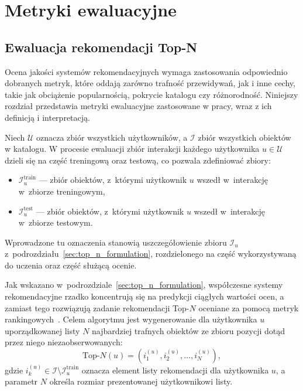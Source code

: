 \chapter{Metryki ewaluacyjne}

\section{Ewaluacja rekomendacji Top-N}

Ocena jakości systemów rekomendacyjnych wymaga zastosowania odpowiednio dobranych metryk, które oddają zarówno trafność przewidywań, jak i inne cechy, takie jak obciążenie popularnością, pokrycie katalogu czy różnorodność. Niniejszy rozdział przedstawia metryki ewaluacyjne zastosowane w pracy, wraz z ich definicją i interpretacją.

Niech $\mathcal{U}$ oznacza zbiór wszystkich użytkowników, a $\mathcal{I}$ zbiór wszystkich obiektów w katalogu. W procesie ewaluacji zbiór interakcji każdego użytkownika $u \in \mathcal{U}$ dzieli się na część treningową oraz testową, co pozwala zdefiniować zbiory:
\begin{itemize}
    \item $\mathcal{I}_u^{\text{train}}$ --- zbiór obiektów, z~którymi użytkownik $u$ wszedł w~interakcję w~zbiorze treningowym,
    \item $\mathcal{I}_u^{\text{test}}$ --- zbiór obiektów, z~którymi użytkownik $u$ wszedł w~interakcję w~zbiorze testowym.
\end{itemize}
Wprowadzone tu oznaczenia stanowią uszczegółowienie zbioru $\mathcal{I}_u$
z~podrozdziału~\ref{sec:top_n_formulation}, rozdzielonego na część
wykorzystywaną do uczenia oraz część służącą ocenie.

Jak wskazano w~podrozdziale~\ref{sec:top_n_formulation}, współczesne systemy rekomendacyjne rzadko koncentrują się na predykcji ciągłych wartości ocen, a zamiast tego rozwiązują zadanie rekomendacji Top-$N$ oceniane za pomocą metryk rankingowych~\cite{li2023recent}. Celem algorytmu jest wygenerowanie dla użytkownika $u$ uporządkowanej listy $N$ najbardziej trafnych obiektów ze zbioru pozycji dotąd przez niego niezaobserwowanych:
\begin{equation}
    \text{Top-}N(u) = \left( i_1^{(u)}, i_2^{(u)}, \dots, i_N^{(u)} \right),
\end{equation}
gdzie $i_k^{(u)} \in \mathcal{I} \setminus \mathcal{I}_u^{\text{train}}$ oznacza element listy rekomendacji dla użytkownika $u$, a parametr $N$ określa rozmiar prezentowanej użytkownikowi listy.

